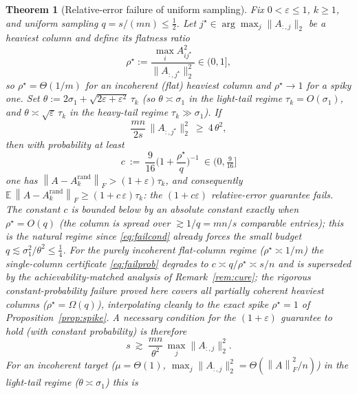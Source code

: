 \documentclass{amsart}
\newtheorem{theorem}{Theorem}
\theoremstyle{definition}
\newcommand{\Frob}[1]{\left\lVert #1\right\rVert_F}
\newcommand{\E}{\mathbb{E}}
\begin{document}
\begin{theorem}[Relative-error failure of uniform sampling]\label{thm:fail}
Fix $0<\varepsilon\le1$, $k\ge1$, and uniform sampling $q=s/(mn)\le\tfrac12$. Let
$j^\star\in\arg\max_j\|A_{:,j}\|_2$ be a heaviest column and define its
\emph{flatness ratio}
\begin{equation}\label{eq:flat}
\rho^\star:=\frac{\max_i A_{ij^\star}^2}{\|A_{:,j^\star}\|_2^2}\in(0,1],
\end{equation}
so $\rho^\star=\Theta(1/m)$ for an incoherent (flat) heaviest column and
$\rho^\star\to1$ for a spiky one. Set
$\theta:=2\sigma_1+\sqrt{2\varepsilon+\varepsilon^2}\,\tau_k$ (so
$\theta\asymp\sigma_1$ in the light-tail regime $\tau_k=O(\sigma_1)$, and
$\theta\asymp\sqrt\varepsilon\,\tau_k$ in the heavy-tail regime
$\tau_k\gg\sigma_1$). If
\begin{equation}\label{eq:failcond}
\frac{mn}{2s}\,\|A_{:,j^\star}\|_2^2\ \ge\ 4\,\theta^2 ,
\end{equation}
then with probability at least
\begin{equation}\label{eq:failprob}
c\ :=\ \frac{9}{16}\Big(1+\frac{\rho^\star}{q}\Big)^{-1}\ \in(0,\tfrac9{16}]
\end{equation}
one has $\Frob{A-A_k^{\mathrm{rand}}}>(1+\varepsilon)\tau_k$, and consequently
$\E\,\Frob{A-A_k^{\mathrm{rand}}}\ge(1+c\,\varepsilon)\tau_k$: the
$(1+c\varepsilon)$ relative-error guarantee fails. The constant $c$ is bounded
below by an absolute constant exactly when $\rho^\star=O(q)$ (the column is
spread over $\gtrsim 1/q=mn/s$ comparable entries); this is the natural regime
since \eqref{eq:failcond} already forces the small budget $q\lesssim\sigma_1^2/\theta^2\le\tfrac14$.
For the purely incoherent flat-column regime ($\rho^\star\asymp1/m$) the
single-column certificate \eqref{eq:failprob} degrades to $c\asymp q/\rho^\star\asymp s/n$
and is superseded by the achievability-matched analysis of
Remark~\ref{rem:cure}; the rigorous constant-probability failure proved here
covers all \emph{partially coherent} heaviest columns ($\rho^\star=\Omega(q)$),
interpolating cleanly to the exact spike $\rho^\star=1$ of
Proposition~\ref{prop:spike}. A necessary condition for the
$(1+\varepsilon)$ guarantee to hold (with constant probability) is therefore
\begin{equation}\label{eq:barrier}
s\ \gtrsim\ \frac{mn}{\theta^2}\,\max_j\|A_{:,j}\|_2^2 .
\end{equation}
For an incoherent target ($\mu=\Theta(1)$, $\max_j\|A_{:,j}\|_2^2
=\Theta(\Frob A^2/n)$) in the light-tail regime ($\theta\asymp\sigma_1$) this is

\end{theorem}
\end{document}
